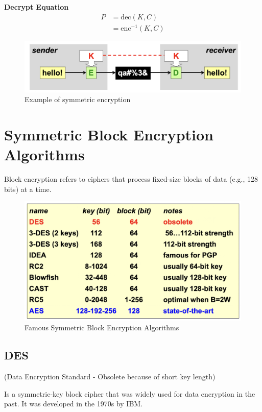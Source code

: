 \textbf{Decrypt Equation}
\begin{equation*}
    \begin{aligned}
        P &= \text{dec}(K, C) \\
          &= \text{enc}^{-1}(K, C)
    \end{aligned}
\end{equation*}
\begin{figure}[H]
    \includegraphics[width=\linewidth]{Images/Cryptography/symmCrypto.png}
    \caption{Example of symmetric encryption}
\end{figure}

\section{Symmetric Block Encryption Algorithms}
Block encryption refers to ciphers that process fixed-size blocks of data (e.g., 128 bits) at a time.

\begin{figure}[H]
    \includegraphics[width=\linewidth]{Images/Cryptography/blockSymm.png}
    \caption{Famous Symmetric Block Encryption Algorithms}
\end{figure}


\subsection{DES}
\begin{center}
    (Data Encryption Standard - Obsolete because of short key length)
\end{center}
Is a symmetric-key block cipher that was widely used for data encryption in the past. It was developed in the 1970s by IBM.

